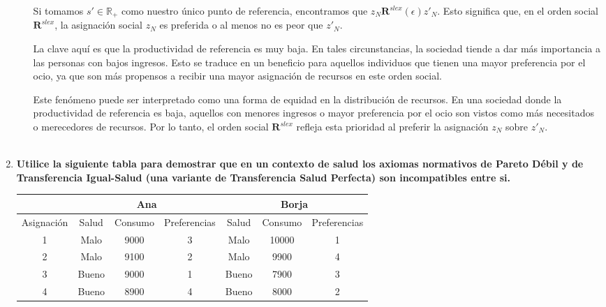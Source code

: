 \begin{enumerate}
\begin{enumerate}[\bfseries i)]
		Si tomamos $s' \in \mathbb{R}_+$ como nuestro único punto de referencia, encontramos que $z_N \textbf{R}^{slex}(\epsilon)z'_N$. Esto significa que, en el orden social $\textbf{R}^{slex}$, la asignación social $z_N$ es preferida o al menos no es peor que $z'_N$.

		La clave aquí es que la productividad de referencia es muy baja. En tales circunstancias, la sociedad tiende a dar más importancia a las personas con bajos ingresos. Esto se traduce en un beneficio para aquellos individuos que tienen una mayor preferencia por el ocio, ya que son más propensos a recibir una mayor asignación de recursos en este orden social.

		Este fenómeno puede ser interpretado como una forma de equidad en la distribución de recursos. En una sociedad donde la productividad de referencia es baja, aquellos con menores ingresos o mayor preferencia por el ocio son vistos como más necesitados o merecedores de recursos. Por lo tanto, el orden social $\textbf{R}^{slex}$ refleja esta prioridad al preferir la asignación $z_N$ sobre $z'_N$.\\\\

	    \end{enumerate}

    \item \textbf{Utilice la siguiente tabla para demostrar que en un contexto de salud los axiomas normativos de Pareto Débil y de Transferencia Igual-Salud (una variante de Transferencia Salud Perfecta) son incompatibles entre si.}

    \begin{center}
	\begin{table}[h]
	    \centering
	    \begin{tabular}{|c|c|c|c|c|c|c|}
		\hline
		 & \multicolumn{3}{c|}{Ana} & \multicolumn{3}{c|}{Borja} \\
		\hline
		Asignación & Salud & Consumo & Preferencias & Salud & Consumo & Preferencias \\
		\hline
		1 & Malo & 9000 & 3 & Malo & 10000 & 1 \\
		2 & Malo & 9100 & 2 & Malo & 9900 & 4 \\
		3 & Bueno & 9000 & 1 & Bueno & 7900 & 3 \\
		4 & Bueno & 8900 & 4 & Bueno & 8000 & 2 \\
		\hline
	    \end{tabular}
	\end{table}
    \end{center}


\end{enumerate}
